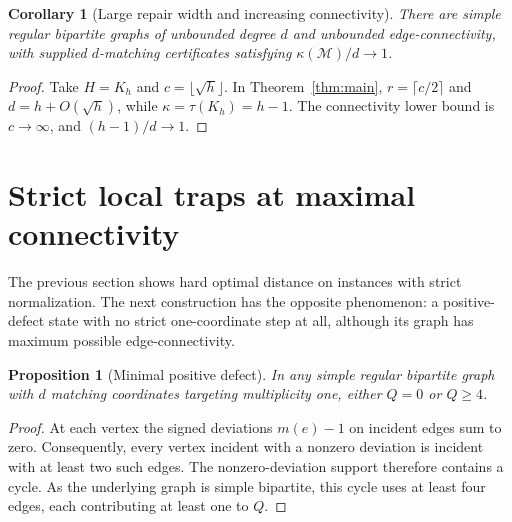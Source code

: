 \documentclass[10pt]{article}
\newtheorem{corollary}[theorem]{Corollary}
\newtheorem{proposition}[theorem]{Proposition}
\newcommand{\M}{\mathcal M}
\begin{document}
\begin{corollary}[Large repair width and increasing connectivity]\label{cor:large}
There are simple regular bipartite graphs of unbounded degree $d$ and unbounded edge-connectivity, with supplied $d$-matching certificates satisfying $\kappa(\M)/d\to1$.
\end{corollary}
\begin{proof}
Take $H=K_h$ and $c=\lfloor\sqrt h\rfloor$. In Theorem~\ref{thm:main}, $r=\lceil c/2\rceil$ and $d=h+O(\sqrt h)$, while $\kappa=\tau(K_h)=h-1$. The connectivity lower bound is $c\to\infty$, and $(h-1)/d\to1$.
\end{proof}

\section{Strict local traps at maximal connectivity}
The previous section shows hard optimal distance on instances with strict normalization. The next construction has the opposite phenomenon: a positive-defect state with no strict one-coordinate step at all, although its graph has maximum possible edge-connectivity.

\begin{proposition}[Minimal positive defect]
In any simple regular bipartite graph with $d$ matching coordinates targeting multiplicity one, either $Q=0$ or $Q\ge4$.
\end{proposition}
\begin{proof}
At each vertex the signed deviations $m(e)-1$ on incident edges sum to zero. Consequently, every vertex incident with a nonzero deviation is incident with at least two such edges. The nonzero-deviation support therefore contains a cycle. As the underlying graph is simple bipartite, this cycle uses at least four edges, each contributing at least one to $Q$.\end{proof}
\end{document}
